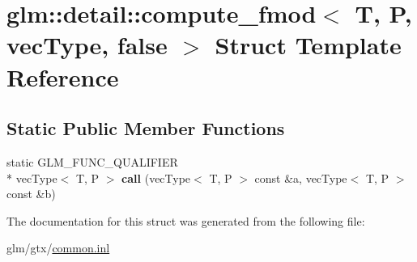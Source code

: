 \hypertarget{structglm_1_1detail_1_1compute__fmod_3_01T_00_01P_00_01vecType_00_01false_01_4}{\section{glm\-:\-:detail\-:\-:compute\-\_\-fmod$<$ T, P, vec\-Type, false $>$ Struct Template Reference}
\label{structglm_1_1detail_1_1compute__fmod_3_01T_00_01P_00_01vecType_00_01false_01_4}
}
\subsection*{Static Public Member Functions}
\begin{DoxyCompactItemize}
\item 
\hypertarget{structglm_1_1detail_1_1compute__fmod_3_01T_00_01P_00_01vecType_00_01false_01_4_aba714e77ed7c4a97b9978c1c09fd6472}{static G\-L\-M\-\_\-\-F\-U\-N\-C\-\_\-\-Q\-U\-A\-L\-I\-F\-I\-E\-R \\*
vec\-Type$<$ T, P $>$ {\bfseries call} (vec\-Type$<$ T, P $>$ const \&a, vec\-Type$<$ T, P $>$ const \&b)}\label{structglm_1_1detail_1_1compute__fmod_3_01T_00_01P_00_01vecType_00_01false_01_4_aba714e77ed7c4a97b9978c1c09fd6472}

\end{DoxyCompactItemize}


The documentation for this struct was generated from the following file\-:\begin{DoxyCompactItemize}
\item 
glm/gtx/\hyperlink{common_8inl}{common.\-inl}\end{DoxyCompactItemize}
